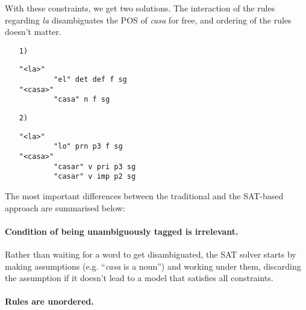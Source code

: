 \documentclass[11pt]{article}
\begin{document}
With these constraints, we get two solutions. The interaction of the rules regarding \emph{la}  disambiguates the POS of \emph{casa} for free, and ordering of the rules doesn't matter. 

\begin{enumerate}
\item [\texttt{1)}]
\begin{verbatim}
"<la>"
        "el" det def f sg
"<casa>"
        "casa" n f sg
\end{verbatim}
\item [\texttt{2)}]
\begin{verbatim}
"<la>"
        "lo" prn p3 f sg
"<casa>"
        "casar" v pri p3 sg
        "casar" v imp p2 sg
\end{verbatim}
\end{enumerate} 



\noindent The most important differences between the traditional and the SAT-based approach are summarised below:

\paragraph{Condition of being unambiguously tagged is irrelevant.}
Rather than waiting for a word to get disambiguated, the SAT solver starts by 
making assumptions (e.g. ``\emph{casa} is a noun'') and working under them,
discarding the assumption if it doesn't lead to a model that satisfies all constraints.

\paragraph{Rules are unordered.}
\end{document}
